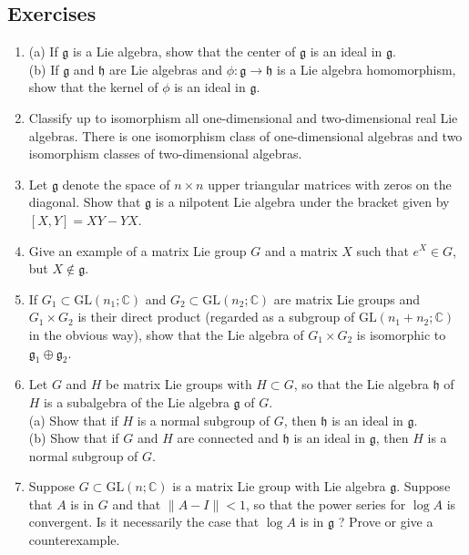 \documentclass[10pt, letterpaper]{article}
\begin{document}
\subsection*{Exercises}
\begin{enumerate}
  \item (a) If $\mathfrak{g}$ is a Lie algebra, show that the center of $\mathfrak{g}$ is an ideal in $\mathfrak{g}$.\\
(b) If $\mathfrak{g}$ and $\mathfrak{h}$ are Lie algebras and $\phi: \mathfrak{g} \rightarrow \mathfrak{h}$ is a Lie algebra homomorphism, show that the kernel of $\phi$ is an ideal in $\mathfrak{g}$.
  \item Classify up to isomorphism all one-dimensional and two-dimensional real Lie algebras. There is one isomorphism class of one-dimensional algebras and two isomorphism classes of two-dimensional algebras.
  \item Let $\mathfrak{g}$ denote the space of $n \times n$ upper triangular matrices with zeros on the diagonal. Show that $\mathfrak{g}$ is a nilpotent Lie algebra under the bracket given by $[X, Y]=X Y-Y X$.
  \item Give an example of a matrix Lie group $G$ and a matrix $X$ such that $e^{X} \in G$, but $X \notin \mathfrak{g}$.
  \item If $G_{1} \subset \mathrm{GL}\left(n_{1} ; \mathbb{C}\right)$ and $G_{2} \subset \mathrm{GL}\left(n_{2} ; \mathbb{C}\right)$ are matrix Lie groups and $G_{1} \times G_{2}$ is their direct product (regarded as a subgroup of $\mathrm{GL}\left(n_{1}+n_{2} ; \mathbb{C}\right)$ in the obvious way), show that the Lie algebra of $G_{1} \times G_{2}$ is isomorphic to $\mathfrak{g}_{1} \oplus \mathfrak{g}_{2}$.
  \item Let $G$ and $H$ be matrix Lie groups with $H \subset G$, so that the Lie algebra $\mathfrak{h}$ of $H$ is a subalgebra of the Lie algebra $\mathfrak{g}$ of $G$.\\
(a) Show that if $H$ is a normal subgroup of $G$, then $\mathfrak{h}$ is an ideal in $\mathfrak{g}$.\\
(b) Show that if $G$ and $H$ are connected and $\mathfrak{h}$ is an ideal in $\mathfrak{g}$, then $H$ is a normal subgroup of $G$.
  \item Suppose $G \subset \mathrm{GL}(n ; \mathbb{C})$ is a matrix Lie group with Lie algebra $\mathfrak{g}$. Suppose that $A$ is in $G$ and that $\|A-I\|<1$, so that the power series for $\log A$ is convergent. Is it necessarily the case that $\log A$ is in $\mathfrak{g}$ ? Prove or give a counterexample.

\end{enumerate}
\end{document}
